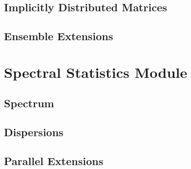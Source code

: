 

\subsection{Implicitly Distributed Matrices}


\subsection{Ensemble Extensions}

\newpage
\section{Spectral Statistics Module}

\subsection{Spectrum}


\subsection{Dispersions}


\subsection{Parallel Extensions}


%

